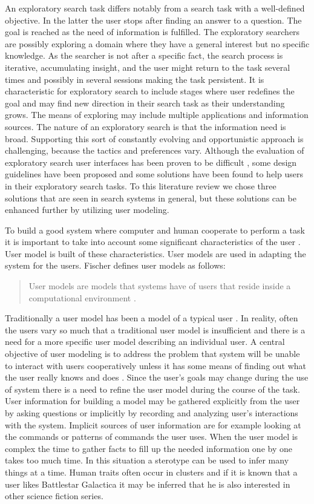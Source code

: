 \documentclass{sigchi}
\begin{document}
An exploratory search task differs notably from a search task with a well-defined objective.
In the latter the user stops after finding an answer to a question.
The goal is reached as the need of information is fulfilled.
The exploratory searchers are possibly exploring a domain where they have a general interest but no specific knowledge.
As the searcher is not after a specific fact, the search process is iterative, accumulating insight, and the user might return to the task several times and possibly in several sessions making the task persistent.
It is characteristic for exploratory search to include stages where user redefines the goal and may find new direction in their search task as their understanding grows.
The means of exploring may include multiple applications and information sources.
The nature of an exploratory search is that the information need is broad.
Supporting this sort of constantly evolving and opportunistic approach is challenging, because the tactics and preferences vary.
Although the evaluation of exploratory search user interfaces has been proven to be difficult \cite{white09}, some design guidelines have been proposed and some solutions have been found to help users in their exploratory search tasks.
To this literature review we chose three solutions that are seen in search systems in general, but these solutions can be enhanced further by utilizing user modeling.

To build a good system where computer and human cooperate to perform a task it is important to take into account some significant characteristics of the user \cite{rich99}.
User model is built of these characteristics.
User models are used in adapting the system for the users.
Fischer defines user models as follows:
\blockquote{User models are models that systems have of users that reside inside a computational environment \cite{fischer01}. }
Traditionally a user model has been a model of a typical user \cite{rich99}.
In reality, often the users vary so much that a traditional user model is insufficient and there is a need for a more specific user model describing an individual user.
A central objective of user modeling is to address the problem that system will be unable to interact with users cooperatively unless it has some means of finding out what the user really knows and does \cite{fischer01}.
Since the user's goals may change during the use of system there is a need to refine the user model during the course of the task.
User information for building a model may be gathered explicitly from the user by asking questions or implicitly by recording and analyzing user's interactions with the system.
Implicit sources of user information are for example looking at the commands or patterns of commands the user uses.
When the user model is complex the time to gather facts to fill up the needed information one by one takes too much time.
In this situation a sterotype can be used to infer many things at a time.
Human traits often occur in clusters and if it is known that a user likes Battlestar Galactica it may be inferred that he is also interested in other science fiction series. 
\end{document}
